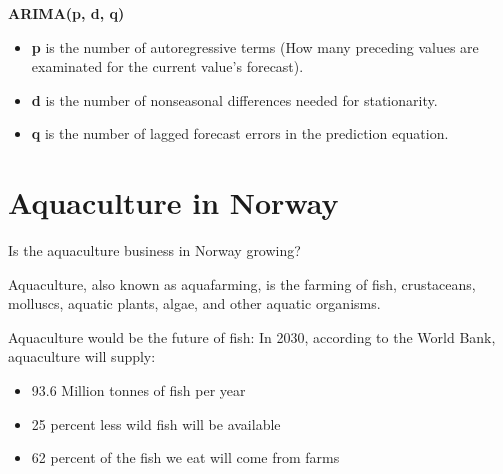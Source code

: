 \textbf{ARIMA(p, d, q)}
  \vspace{-5mm}
\begin{itemize}
 \setlength{\itemsep}{-5pt}
\item \textbf{p} is the number of autoregressive terms (How many preceding values are examinated for the current value’s forecast).

\item \textbf{d} is the number of nonseasonal differences needed for stationarity.

\item \textbf{q} is the number of lagged forecast errors in the prediction equation. 
\end{itemize}

\newpage

\section{Aquaculture in Norway}

Is the aquaculture business in Norway growing? 
  
Aquaculture, also known as aquafarming, is the farming of fish, crustaceans, molluscs, aquatic plants, algae, and other aquatic organisms.

Aquaculture would be the future of fish:
In 2030, according to the World Bank, aquaculture will supply:
\begin{itemize}
\item 93.6 Million tonnes of fish per year
\item 25 percent less wild fish will be available
\item 62 percent of the fish we eat will come from farms
\end{itemize}




